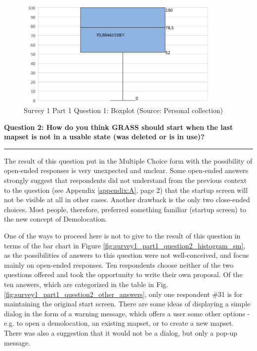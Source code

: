 \documentclass[a4paper,10pt,twoside]{article}
\begin{document}
\vspace{0.3cm}
\begin{figure}[hbt!] 
\begin{center}
\includegraphics[width=10cm]{../surveys/analyzed_data/survey1_part1_question1_excel_boxplot.png} 
\caption[Survey 1 Part 1 Question 1: Boxplot]{Survey 1 Part 1 Question 1: Boxplot (Source: Personal collection)}
\label{fig:survey1_part1_question1_boxplot}
\end{center}
\end{figure}

\newpage
\noindent \textbf{Question 2: How do you think GRASS should start when the last mapset is not in a usable state (was deleted or is in use)?}
\par\noindent\rule{\textwidth}{0.4pt}

\noindent The result of this question put in the Multiple Choice form with the possibility of open-ended responses is very unexpected and unclear. Some open-ended answers strongly suggest that respondents did not understand from the previous context to the question (see Appendix \ref{appendix:A}, page 2) that the startup screen will not be visible at all in other cases. Another drawback is the only two close-ended choices. Most people, therefore, preferred something familiar (startup screen) to the new concept of Demolocation.

One of the ways to proceed here is not to give to the result of this question in terms of the bar chart in Figure \ref{fig:survey1_part1_question2_histogram_sm}, as the possibilities of answers to this question were not well-conceived, and focus mainly on open-ended responses. Ten respondents choose neither of the two questions offered and took the opportunity to write their own proposal. Of the ten answers, which are categorized in the table in Fig. \ref{fig:survey1_part1_question2_other_answers}, only one respondent \#31 is for maintaining the original start screen. There are some ideas of displaying a simple dialog in the form of a warning message, which offers a user some other options - e.g. to open a demolocation, an existing mapset, or to create a new mapset. There was also a suggestion that it would not be a dialog, but only a pop-up message.
\end{document}
